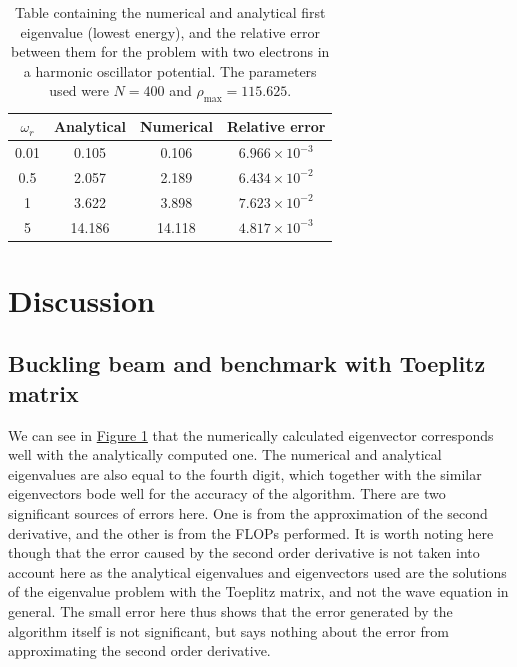 \documentclass[reprint,english,notitlepage]{revtex4-1}  %
\begin{document}
\begin{table}[h!] \label{table:IV:c:1}
\caption{Table containing the numerical and analytical first eigenvalue (lowest energy), and the relative error between them for the problem with two electrons in a harmonic oscillator potential. The parameters used were $N=400$ and $\rho_\text{max} = 115.625$.}
\begin{tabular}{|c|c|c|c|}
\hline
$\omega_r$ & Analytical & Numerical & Relative error \\
\hline
0.01 &    0.105    &      0.106  &    $6.966 \times 10^{-3}$ \\
\hline
0.5 &    2.057     &      2.189   &    $6.434 \times 10^{-2}$ \\
\hline
1 &   3.622     &     3.898   &    $7.623 \times 10^{-2}$ \\
\hline
5 &   14.186     &     14.118   &    $4.817 \times 10^{-3}$ \\
\hline
\end{tabular}
\end{table}

\newpage

\section{Discussion} \label{sec:V}

\subsection{Buckling beam and benchmark with Toeplitz matrix} \label{sec:V:a}

We can see in \hyperref[fig:IV:a:1]{Figure 1} that the numerically calculated eigenvector corresponds well with the analytically computed one. The numerical and analytical eigenvalues are also equal to the fourth digit, which together with the similar eigenvectors bode well for the accuracy of the algorithm. There are two significant sources of errors here. One is from the approximation of the second derivative, and the other is from the FLOPs performed. It is worth noting here though that the error caused by the second order derivative is not taken into account here as the analytical eigenvalues and eigenvectors used are the solutions of the eigenvalue problem with the Toeplitz matrix, and not the wave equation in general. The small error here thus shows that the error generated by the algorithm itself is not significant, but says nothing about the error from approximating the second order derivative.
\end{document}
